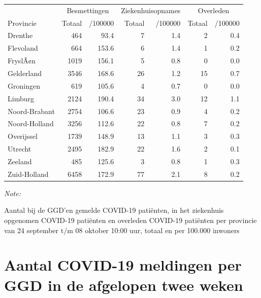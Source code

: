 \documentclass[
  english,
  man,floatsintext]{apa6}
\begin{document}
\begin{table}
\centering
\begin{threeparttable}
\begin{tabular}{lrrrrrr}
\toprule
\multicolumn{1}{c}{ } & \multicolumn{2}{c}{Besmettingen} & \multicolumn{2}{c}{Ziekenhuisopnames} & \multicolumn{2}{c}{Overleden} \\
\cmidrule(l{3pt}r{3pt}){2-3} \cmidrule(l{3pt}r{3pt}){4-5} \cmidrule(l{3pt}r{3pt}){6-7}
Provincie & Totaal & /100000 & Totaal & /100000 & Totaal & /100000\\
\midrule
Drenthe & 464 & 93.4 & 7 & 1.4 & 2 & 0.4\\
Flevoland & 664 & 153.6 & 6 & 1.4 & 1 & 0.2\\
FryslÃ¢n & 1019 & 156.1 & 5 & 0.8 & 0 & 0.0\\
Gelderland & 3546 & 168.6 & 26 & 1.2 & 15 & 0.7\\
Groningen & 619 & 105.6 & 4 & 0.7 & 0 & 0.0\\
Limburg & 2124 & 190.4 & 34 & 3.0 & 12 & 1.1\\
Noord-Brabant & 2754 & 106.6 & 23 & 0.9 & 4 & 0.2\\
Noord-Holland & 3256 & 112.6 & 22 & 0.8 & 7 & 0.2\\
Overijssel & 1739 & 148.9 & 13 & 1.1 & 3 & 0.3\\
Utrecht & 2495 & 182.9 & 22 & 1.6 & 2 & 0.1\\
Zeeland & 485 & 125.6 & 3 & 0.8 & 1 & 0.3\\
Zuid-Holland & 6458 & 172.9 & 77 & 2.1 & 8 & 0.2\\
\bottomrule
\end{tabular}
\begin{tablenotes}
\item \textit{Note: } 
\item Aantal bij de GGD’en gemelde COVID-19 patiënten, in het ziekenhuis opgenomen COVID-19 patiënten en overleden COVID-19 patiënten per provincie van 24 september t/m 08 oktober 10:00 uur, totaal en per 100.000 inwoners
\end{tablenotes}
\end{threeparttable}
\end{table}

\newpage

\hypertarget{aantal-covid-19-meldingen-per-ggd-in-de-afgelopen-twee-weken}{%
\section{Aantal COVID-19 meldingen per GGD in de afgelopen twee weken}\label{aantal-covid-19-meldingen-per-ggd-in-de-afgelopen-twee-weken}}
\end{document}
